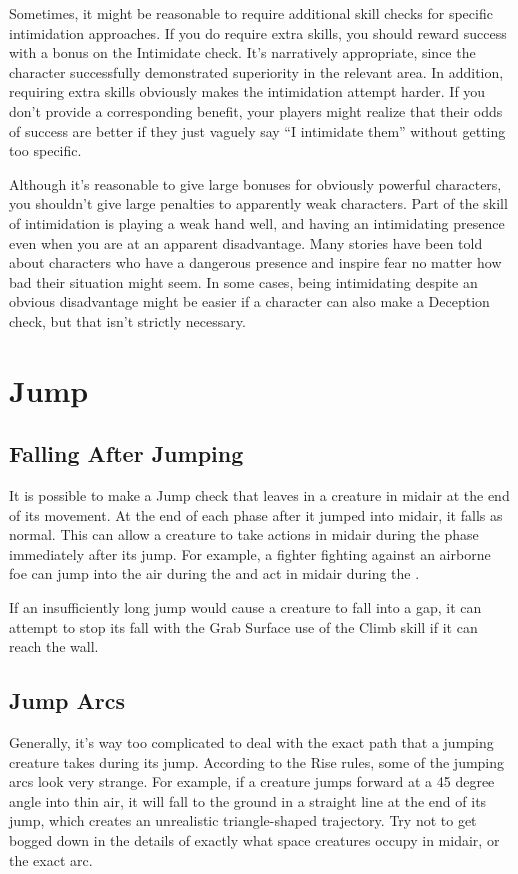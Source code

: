     Sometimes, it might be reasonable to require additional skill checks for specific intimidation approaches.
    If you do require extra skills, you should reward success with a bonus on the Intimidate check.
    It's narratively appropriate, since the character successfully demonstrated superiority in the relevant area.
    In addition, requiring extra skills obviously makes the intimidation attempt harder.
    If you don't provide a corresponding benefit, your players might realize that their odds of success are better if they just vaguely say ``I intimidate them'' without getting too specific.

    Although it's reasonable to give large bonuses for obviously powerful characters, you shouldn't give large penalties to apparently weak characters.
    Part of the skill of intimidation is playing a weak hand well, and having an intimidating presence even when you are at an apparent disadvantage.
    Many stories have been told about characters who have a dangerous presence and inspire fear no matter how bad their situation might seem.
    In some cases, being intimidating despite an obvious disadvantage might be easier if a character can also make a Deception check, but that isn't strictly necessary.

\section{Jump}\label{Jump}

    \subsection{Falling After Jumping}
        It is possible to make a Jump check that leaves in a creature in midair at the end of its movement.
        At the end of each phase after it jumped into midair, it falls as normal.
        This can allow a creature to take actions in midair during the phase immediately after its jump.
        For example, a fighter fighting against an airborne foe can jump into the air during the  and act in midair during the .

        If an insufficiently long jump would cause a creature to fall into a gap, it can attempt to stop its fall with the Grab Surface use of the Climb skill if it can reach the wall.

    \subsection{Jump Arcs}
        Generally, it's way too complicated to deal with the exact path that a jumping creature takes during its jump.
        According to the Rise rules, some of the jumping arcs look very strange.
        For example, if a creature jumps forward at a 45 degree angle into thin air, it will fall to the ground in a straight line at the end of its jump, which creates an unrealistic triangle-shaped trajectory.
        Try not to get bogged down in the details of exactly what space creatures occupy in midair, or the exact arc.

